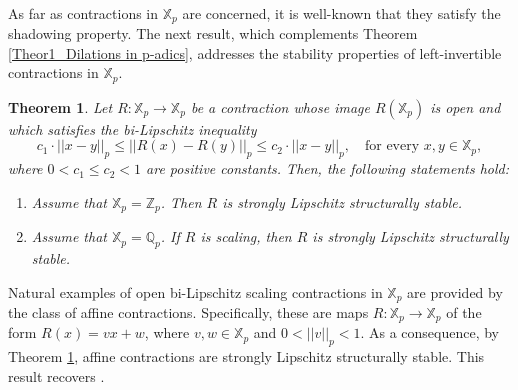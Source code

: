 \documentclass[a4paper, 12pt]{article}
\newtheorem{theorem}{Theorem}[section]
\theoremstyle{definition}
\begin{document}
	
	
	
	\paragraph{}
	
	As far as contractions in $\mathbb{X}_{p}$ are concerned, it is well-known that they satisfy the shadowing property. 
	The next result, which complements Theorem \ref{Theor1_Dilations in p-adics}, addresses the stability properties of left-invertible contractions in $\mathbb{X}_{p}$. 
	
	
	\begin{theorem}\label{Theor3_Contractions in p-adics}  
		Let $R: \mathbb{X}_{p} \to \mathbb{X}_{p}$ be a contraction whose image $R \left(  \mathbb{X}_{p}  \right) $ is open and which satisfies the bi-Lipschitz inequality 
		\begin{equation}\label{Eq2_Bi-Lipschitz Contractions}
			c_{1}\cdot  \left| \left|  x -y  \right|  \right|_{p}   \le       \left| \left|  R(x) - R(y)  \right|  \right|_{p}   \le   c_{2} \cdot  \left| \left|  x -y  \right|  \right|_{p}, \quad \text{for every }  x,y \in \mathbb{X}_{p},  
		\end{equation}
		where $ 0  < c_{1} \le c_{2}  < 1 $ are positive constants.  Then, the following statements hold:
		\begin{enumerate}
			
			
			\item Assume that $\mathbb{X}_{p} = \mathbb{Z}_{p}$. Then $R$ is strongly Lipschitz structurally stable. 
			
			
			\item Assume that $\mathbb{X}_{p} = \mathbb{Q}_{p}$. If $R$ is scaling, then $R$ is strongly Lipschitz structurally stable.
			
			
			
		\end{enumerate}
		
	\end{theorem}
	
	
	
	
	Natural examples of open bi-Lipschitz scaling contractions in $\mathbb{X}_{p}$ are provided by the class of affine contractions. Specifically, these are maps $R: \mathbb{X}_{p} \to \mathbb{X}_{p}$ of the form $R(x) = vx + w$, where $v, w \in \mathbb{X}_{p}$ and $ 0 <  \left| \left|  v  \right|  \right|_{p} < 1$. 
	As a consequence, by Theorem \ref{Theor3_Contractions in p-adics}, affine contractions are strongly Lipschitz structurally stable. This result recovers \cite[Theorem 30]{Bastos-Caprio-Messaudi_Shadowing_and_Stability_in_p-adic_Dynamics}. 
	
\end{document}
